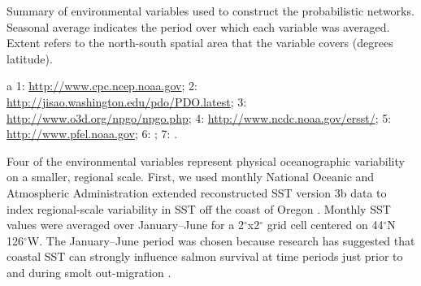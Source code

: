 \begin{table}[htbp]
  \small \centering \libertineLF
  \caption[Summary of environmental variables used to construct the
           probabilistic networks]{Summary of environmental variables used to
           construct the probabilistic networks. Seasonal average indicates
           the period over which each variable was averaged. Extent refers to
           the north-south spatial area that the variable covers (degrees
           latitude).}
  \begin{threeparttable}
    
    \begin{tablenotes}
      {\footnotesize
        \item[a] 1: \url{http://www.cpc.ncep.noaa.gov};
                 2: \url{http://jisao.washington.edu/pdo/PDO.latest};
                 3: \url{http://www.o3d.org/npgo/npgo.php};
                 4: \url{http://www.ncdc.noaa.gov/ersst/};
                 5: \url{http://www.pfel.noaa.gov};
                 6: \citet{Peterson2012a};
                 7: \citet{PFMC2013}.
        }
    \end{tablenotes}
  \end{threeparttable}
  \label{tab:bn:1}
\end{table}

Four of the environmental variables represent physical oceanographic variability
on a smaller, regional scale. First, we used monthly National Oceanic and
Atmospheric Administration extended reconstructed SST version 3b data to index
regional-scale variability in SST off the coast of Oregon \citep{Smith2008a}.
Monthly SST values were averaged over January--June for a 2$^{\circ}$x2$^{\circ}$
grid cell centered on 44$^{\circ}$N 126$^{\circ}$W. The January--June period was
chosen because research has suggested that coastal SST can strongly influence
salmon survival at time periods just prior to and during smolt out-migration
\citep{Mueter2005a}.

